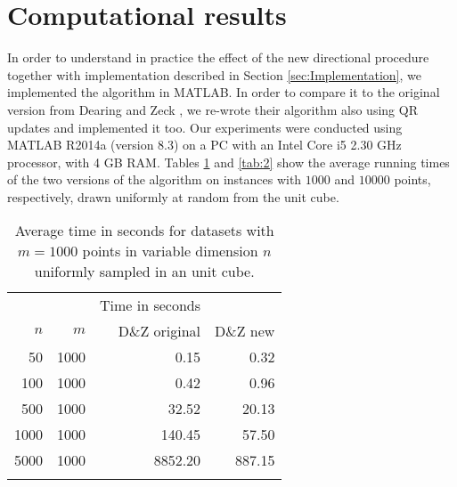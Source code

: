 \section{Computational results}\label{sec:Results}

In order to understand in practice the effect of the new directional procedure together with implementation described in Section \ref{sec:Implementation}, we implemented the algorithm in MATLAB. In order to compare it to the original version from Dearing and Zeck \cite{Dearing09}, we re-wrote their algorithm also using QR updates and implemented it too. Our experiments were conducted using MATLAB R2014a (version 8.3) on a PC with an Intel Core i5 2.30 GHz processor, with 4 GB RAM. Tables \ref{tab:1} and \ref{tab:2} show the average running times of the two versions of the algorithm on instances with $1000$ and $10000$ points, respectively, drawn uniformly at random from the unit cube. 
\begin{table}
\caption{Average time in seconds for datasets with $m=1000$ points in variable dimension $n$ uniformly sampled in an unit cube.}
\begin{center}\begin{tabular}{rrrrr}
\hline\noalign{\smallskip}
\multicolumn{2}{c}{Problem} & &\multicolumn{2}{c}{Time in seconds}\\
\noalign{\smallskip}\cline{1-2}\cline{4-5}\noalign{\smallskip}
$n$ &  $m$ && D\&Z original & D\&Z new\\
\noalign{\smallskip}\hline\noalign{\smallskip}
50 & 1000 && 0.15 &	0.32		 \\
100 & 1000 && 0.42 & 0.96 \\
500 & 1000 && 32.52 &	20.13 \\	
1000 & 1000 && 140.45 & 57.50	\\
5000 & 1000 && 8852.20 & 887.15 \\
\noalign{\smallskip}\hline
\end{tabular}\end{center}\label{tab:1}  
\end{table}

